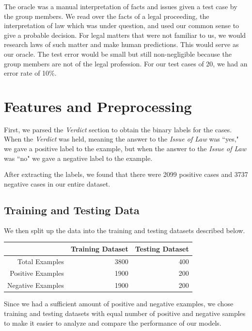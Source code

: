 \documentclass[journal]{IEEEtran}
\begin{document}
The oracle was a manual interpretation of facts and issues given a test case by the group members. We read over the facts of a legal proceeding, the interpretation of law which was under question, and used our common sense to give a probable decision. For legal matters that were not familiar to us, we would research laws of such matter and make human predictions. This would serve as our oracle. The test error would be small but still non-negligible because the group members are not of the legal profession. For our test cases of 20, we had an error rate of 10\%. 

\section{Features and Preprocessing}

First, we parsed the \textit{Verdict} section to obtain the binary labels for the cases. When the \textit{Verdict} was held, meaning the answer to the \textit{Issue of Law} was ``yes," we gave a positive label to the example, but when the answer to the \textit{Issue of Law} was ``no" we gave a negative label to the example. 

After extracting the labels, we found that there were 2099 positive cases and 3737 negative cases in our entire dataset.

\subsection{Training and Testing Data}

We then split up the data into the training and testing datasets described below.

\begin{table}[ht]
\centering
\begin{tabular}{rrr}
  \hline
& Training Dataset &	Testing Dataset\\
  \hline
Total Examples&	3800&	400 \\
Positive Examples &	1900 &	200 \\
Negative Examples &	1900 &	200 \\
   \hline
\end{tabular}
\end{table}

Since we had a sufficient amount of positive and negative examples, we chose training and testing datasets with equal number of positive and negative samples to make it easier to analyze and compare the performance of our models.
\end{document}
